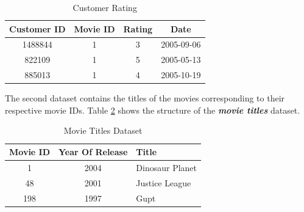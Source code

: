 \documentclass[a4paper,10pt]{article}
\begin{document}
\begin{table}[H]
    \center 
    
    \begin{tabular}{|c|c|c|c|} \hline 
         Customer ID&  Movie ID&  Rating& Date\\ \hline 
         1488844&  1&  3& 2005-09-06
\\ \hline 
         822109&  1&  5& 2005-05-13
\\ \hline 
         885013&  1&  4& 2005-10-19
\\ \hline
    \end{tabular}
    \caption{Customer Rating}   
    \label{Data_1} 
\end{table}

The second dataset contains the titles of the movies corresponding to their respective movie IDs. Table \ref{Movie_titles} shows the structure of the \textit{\textbf{movie titles}} dataset. 

\begin{table}[H]
    \centering
    \begin{tabular}{|c|c|l|} \hline 
         Movie ID& Year Of Release&Title\\ \hline 
         1& 2004&Dinosaur Planet\\ \hline 
         48&  2001&Justice League\\ \hline 
         198
&  1997&Gupt\\ \hline
    \end{tabular}
    \caption{Movie Titles Dataset}
    \label{Movie_titles}
\end{table}
\end{document}
